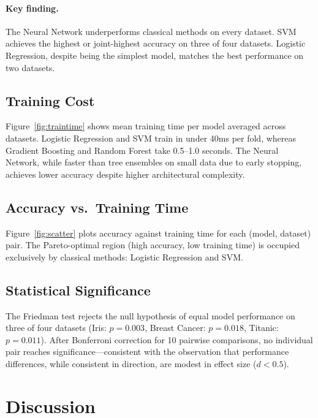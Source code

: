 \documentclass[10pt,twocolumn]{article}
\begin{document}
\paragraph{Key finding.}
The Neural Network underperforms classical methods on every dataset. 
SVM achieves the highest or joint-highest accuracy on three of four datasets. 
Logistic Regression, despite being the simplest model, matches the best performance on two datasets.

\subsection{Training Cost}

Figure~\ref{fig:traintime} shows mean training time per model averaged across datasets.
Logistic Regression and SVM train in under 40ms per fold, whereas Gradient Boosting and 
Random Forest take 0.5--1.0 seconds. The Neural Network, while faster than tree ensembles 
on small data due to early stopping, achieves lower accuracy despite higher architectural complexity.

\subsection{Accuracy vs.\ Training Time}

Figure~\ref{fig:scatter} plots accuracy against training time for each (model, dataset) pair. 
The Pareto-optimal region (high accuracy, low training time) is occupied exclusively by 
classical methods: Logistic Regression and SVM.

\subsection{Statistical Significance}

The Friedman test rejects the null hypothesis of equal model performance on three of 
four datasets (Iris: $p=0.003$, Breast Cancer: $p=0.018$, Titanic: $p=0.011$). 
After Bonferroni correction for 10 pairwise comparisons, no individual pair reaches 
significance—consistent with the observation that performance differences, while 
consistent in direction, are modest in effect size ($d < 0.5$).

\section{Discussion}
\end{document}
